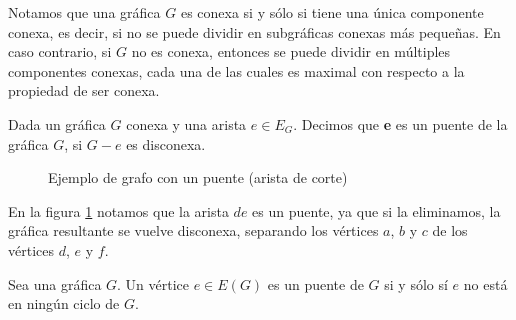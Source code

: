  Notamos que una gráfica $G$ es conexa si y sólo si tiene una única componente conexa, es decir, si no se puede dividir en subgráficas conexas más pequeñas. En caso contrario, si $G$ no es conexa, entonces se puede dividir en múltiples componentes conexas, cada una de las cuales es maximal con respecto a la propiedad de ser conexa.
 \begin{definition}[Puente]
 Dada un gráfica $G$ conexa y una arista $e \in E_G$. Decimos que \textbf{e} es un puente de la gráfica $G$, si $G - e$ es disconexa.
 \end{definition}

 \begin{example}
    \begin{figure}[h]
    \centering
    \caption{Ejemplo de grafo con un puente (arista de corte)}
    \label{fig:puente}
\end{figure}

 \end{example}
En la figura \ref{fig:puente} notamos que la arista $de$ es un puente, ya que si la eliminamos, la gráfica resultante se vuelve disconexa, separando los vértices $a$, $b$ y $c$ de los vértices $d$, $e$ y $f$.
 
 \begin{proposition}
     Sea una gráfica $G$.
     Un vértice $e \in E(G)$ es un puente de $G$ si y sólo sí $e$ no está en ningún ciclo de $G$.
 \end{proposition}
 
